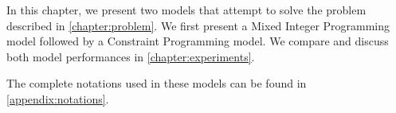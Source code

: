 \documentclass[../../thesis.tex]{subfiles}
\begin{document}
In this chapter, we present two models that attempt to solve the problem described in \autoref{chapter:problem}.
We first present 
a Mixed Integer Programming model followed by a Constraint Programming model.
We compare and discuss both model performances in \autoref{chapter:experiments}.

The complete notations used in these models can be found in \autoref{appendix:notations}.
\end{document}
